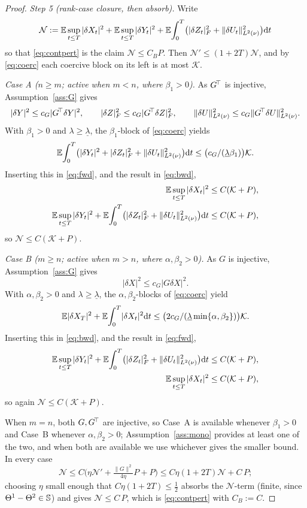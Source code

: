 \begin{proof}
\emph{Step 5 (rank-case closure, then absorb).} Write
\[
\mathcal N:=\mathbb{E}\sup_{t\le T}|\delta X_t|^2+\mathbb{E}\sup_{t\le T}|\delta Y_t|^2+\mathbb{E}\!\int_0^T\!\big(|\delta Z_t|_F^2+\lVert \delta U_t\rVert_{L^2(\nu)}^2\big)\mathrm{d} t
\]
so that \eqref{eq:contpert} is the claim $\mathcal N\le C_B P$. Then
$\mathcal N'\le(1+2T)\mathcal N$, and by
\eqref{eq:coerc} each coercive block on its left is at most $\mathcal K$.

\emph{Case A ($n\ge m$; active when $m<n$, where $\beta_1>0$).} As $G^{\!\top}$ is injective,
Assumption~\ref{ass:G} gives
\[
|\delta Y|^2\le c_G|G^{\!\top}\delta Y|^2,\qquad
|\delta Z|_F^2\le c_G|G^{\!\top}\delta Z|_F^2,\qquad
\lVert \delta U\rVert_{L^2(\nu)}^2\le c_G\lVert G^{\!\top}\delta U\rVert_{L^2(\nu)}^2 .
\]
With $\beta_1>0$ and $\lambda\ge\underline\lambda$, the $\beta_1$-block of \eqref{eq:coerc} yields
\[
\mathbb{E}\!\int_0^T\!\big(|\delta Y_t|^2+|\delta Z_t|_F^2+\lVert \delta U_t\rVert_{L^2(\nu)}^2\big)\mathrm{d} t\le\bigl(c_G/(\underline\lambda\beta_1)\bigr)\mathcal K.
\]
Inserting this in \eqref{eq:fwd}, and the result in \eqref{eq:bwd},
\[
\begin{aligned}
\mathbb{E}\sup_{t\le T}|\delta X_t|^2&\le C(\mathcal K+P),\\
\mathbb{E}\sup_{t\le T}|\delta Y_t|^2
+\mathbb{E}\!\int_0^T\!\big(|\delta Z_t|_F^2+\lVert \delta U_t\rVert_{L^2(\nu)}^2\big)\mathrm{d} t&\le C(\mathcal K+P),
\end{aligned}
\]
so $\mathcal N\le C(\mathcal K+P)$.

\emph{Case B ($m\ge n$; active when $m>n$, where $\alpha,\beta_2>0$).} As $G$ is injective,
Assumption~\ref{ass:G} gives
\[
|\delta X|^2\le c_G|G\delta X|^2 .
\]
With $\alpha,\beta_2>0$ and $\lambda\ge\underline\lambda$, the $\alpha,\beta_2$-blocks of
\eqref{eq:coerc} yield
\[
\mathbb{E}|\delta X_T|^2+\mathbb{E}\!\int_0^T\!|\delta X_t|^2\mathrm{d} t\le\bigl(2c_G/(\underline\lambda\min\{\alpha,\beta_2\})\bigr)\mathcal K.
\]
Inserting this in \eqref{eq:bwd}, and the result in \eqref{eq:fwd},
\[
\begin{aligned}
\mathbb{E}\sup_{t\le T}|\delta Y_t|^2
+\mathbb{E}\!\int_0^T\!\big(|\delta Z_t|_F^2+\lVert \delta U_t\rVert_{L^2(\nu)}^2\big)\mathrm{d} t&\le C(\mathcal K+P),\\
\mathbb{E}\sup_{t\le T}|\delta X_t|^2&\le C(\mathcal K+P),
\end{aligned}
\]
so again $\mathcal N\le C(\mathcal K+P)$.

When $m=n$, both $G,G^{\!\top}$ are injective, so Case~A is available whenever $\beta_1>0$ and
Case~B whenever $\alpha,\beta_2>0$; Assumption~\ref{ass:mono} provides at least one of the
two, and when both are available we use whichever gives the smaller bound. In every
case
\[
\mathcal N\le C\Big(\eta\mathcal N'+\tfrac{\|G\|^2}{4\eta} P+P\Big)\le C\eta(1+2T)\mathcal N+C\,P;
\]
choosing $\eta$
small enough that $C\eta(1+2T)\le\tfrac12$ absorbs the $\mathcal N$-term (finite,
since $\Theta^1-\Theta^2\in\mathbb{S}$) and gives
$\mathcal N\le C\,P$, which is \eqref{eq:contpert} with $C_B:=C$.
\end{proof}

